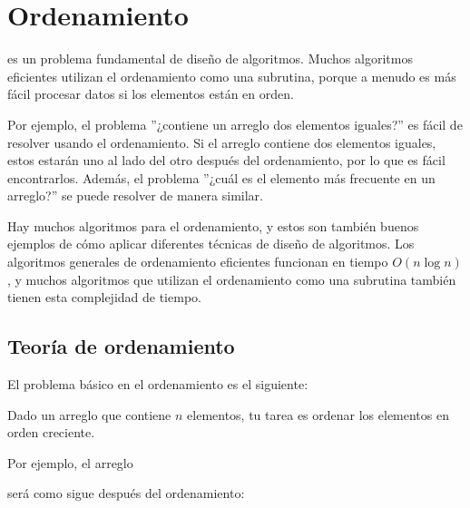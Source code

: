 \chapter{Ordenamiento}


es un problema fundamental de diseño de algoritmos.
Muchos algoritmos eficientes
utilizan el ordenamiento como una subrutina,
porque a menudo es más fácil procesar
datos si los elementos están en orden.

Por ejemplo, el problema ''¿contiene un arreglo
dos elementos iguales?'' es fácil de resolver usando el ordenamiento.
Si el arreglo contiene dos elementos iguales,
estos estarán uno al lado del otro después del ordenamiento,
por lo que es fácil encontrarlos.
Además, el problema ''¿cuál es el elemento más frecuente
en un arreglo?'' se puede resolver de manera similar.

Hay muchos algoritmos para el ordenamiento, y estos son
también buenos ejemplos de cómo aplicar
diferentes técnicas de diseño de algoritmos.
Los algoritmos generales de ordenamiento eficientes
funcionan en tiempo $O(n \log n)$,
y muchos algoritmos que utilizan el ordenamiento
como una subrutina también
tienen esta complejidad de tiempo.

\section{Teoría de ordenamiento}

El problema básico en el ordenamiento es el siguiente:
\begin{framed}
\noindent
Dado un arreglo que contiene $n$ elementos,
tu tarea es ordenar los elementos
en orden creciente.
\end{framed}
\noindent
Por ejemplo, el arreglo
\begin{center}
\end{center}
será como sigue después del ordenamiento:
\begin{center}
\end{center}


